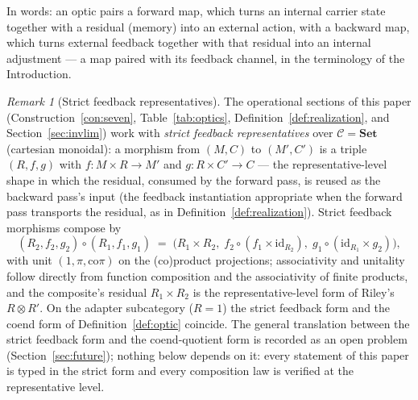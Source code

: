 \documentclass[11pt,a4paper]{article}
\theoremstyle{plain}
\theoremstyle{definition}
\theoremstyle{remark}
\newtheorem{remark}[theorem]{Remark}
\newcommand{\CC}{\mathcal{C}}
\begin{document}
In words: an optic pairs a forward map, which turns an internal
carrier state together with a residual (memory) into an external
action, with a backward map, which turns external feedback together
with that residual into an internal adjustment --- a map paired
with its feedback channel, in the terminology of the Introduction.

\begin{remark}[Strict feedback representatives]
\label{rem:optic-strict}
The operational sections of this paper
(Construction~\ref{con:seven}, Table~\ref{tab:optics},
Definition~\ref{def:realization}, and
Section~\ref{sec:invlim}) work with \emph{strict feedback
representatives} over $\CC = \mathbf{Set}$ (cartesian monoidal): a
morphism from $(M, C)$ to $(M', C')$ is a triple $(R, f, g)$ with
$f : M \times R \to M'$ and $g : R \times C' \to C$ --- the
representative-level shape in which the residual, consumed by the
forward pass, is reused as the backward pass's input (the feedback
instantiation appropriate when the forward pass transports the
residual, as in Definition~\ref{def:realization}). Strict feedback
morphisms compose by
\begin{equation}\label{eq:feedback-comp}
  (R_2, f_2, g_2) \circ (R_1, f_1, g_1)
  \;=\; \bigl(R_1 \times R_2,\;
  f_2 \circ (f_1 \times \mathrm{id}_{R_2}),\;
  g_1 \circ (\mathrm{id}_{R_1} \times g_2)\bigr),
\end{equation}
with unit $(1, \pi, \mathrm{co}\pi)$ on the (co)product projections;
associativity and unitality follow directly from function
composition and the associativity of finite products, and the
composite's residual $R_1 \times R_2$ is the representative-level
form of Riley's $R \otimes R'$. On the adapter subcategory
($R = 1$) the strict feedback form and the coend form of
Definition~\ref{def:optic} coincide. The general translation
between the strict feedback form and the coend-quotient form is
recorded as an open problem (Section~\ref{sec:future}); nothing
below depends on it: every statement of this paper is typed in the
strict form and every composition law is verified at the
representative level.
\end{remark}
\end{document}
